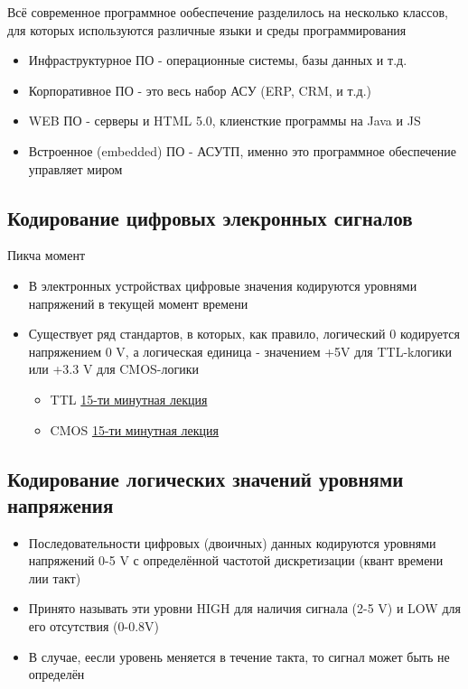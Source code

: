 \documentclass{article}
\theoremstyle{problemstyle}
\theoremstyle{ans}
\begin{document}
Всё современное программное ообеспечение разделилось на несколько классов, для которых используются различные языки и среды программирования

\begin{itemize}
    \item Инфраструктурное ПО - операционные системы, базы данных и т.д.
    \item Корпоративное ПО - это весь набор АСУ (ERP, CRM, и т.д.)
    \item WEB ПО - серверы и HTML 5.0, клиенсткие программы на Java и JS
    \item Встроенное (embedded) ПО - АСУТП, именно это программное обеспечение управляет миром
\end{itemize}

\subsection{Кодирование цифровых элекронных сигналов}
Пикча момент

\begin{itemize}
    \item В электронных устройствах цифровые значения кодируются уровнями напряжений в текущей момент времени
    \item Существует ряд стандартов, в которых, как правило, логический 0 кодируется напряжением 0 V, а логическая единица - значением +5V для TTL-kлогики или +3.3 V для CMOS-логики
    \begin{itemize}
        \item TTL \href{https://www.youtube.com/watch?v=qOtHc_x70hY}{15-ти минутная лекция}
        \item CMOS \href{https://www.youtube.com/watch?v=9eIkCWrPIqY}{15-ти минутная лекция}
    \end{itemize}
\end{itemize}


\subsection{Кодирование логических значений уровнями напряжения}
\begin{itemize}
    \item Последовательности цифровых (двоичных) данных кодируются уровнями напряжений 0-5 V с определённой частотой дискретизации (квант времени лии такт)
    \item Принято называть эти уровни HIGH для наличия сигнала (2-5 V) и LOW для его отсутствия (0-0.8V)
    \item В случае, еесли уровень меняется в течение такта, то сигнал может быть не определён
\end{itemize}
\end{document}
